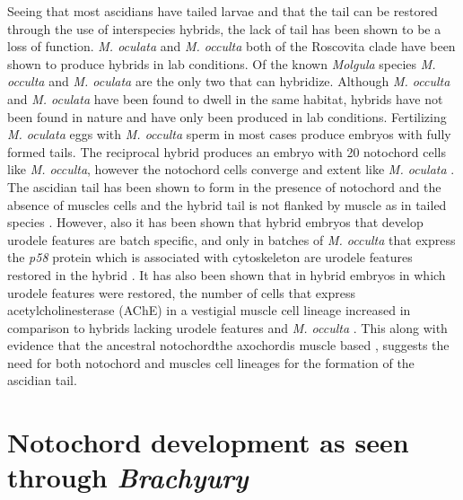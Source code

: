 Seeing that most ascidians have tailed larvae and that the tail can be restored through the use of interspecies hybrids, the lack of tail has been shown to be a loss of function. \textit{M. oculata} and \textit{M. occulta} both of the Roscovita clade have been shown to produce hybrids in lab conditions. Of the known \textit{Molgula} species \textit{M. occulta} and \textit{M. oculata} are the only two that can hybridize. Although \textit{M. occulta} and \textit{M. oculata} have been found to dwell in the same habitat, hybrids have not been found in nature and have only been produced in lab conditions. Fertilizing \textit{M. oculata} eggs with \textit{M. occulta} sperm in most cases produce embryos with fully formed tails. The reciprocal hybrid produces an embryo with 20 notochord cells like \textit{M. occulta}, however the notochord cells converge and extent like \textit{M. oculata} \cite{swalla_interspecific_1990}. The ascidian tail has been shown to form in the presence of notochord and the absence of muscles cells \cite{miyamoto_formation_1985} and the hybrid tail is not flanked by muscle as in tailed species \cite{swalla_novel_1993}. However, also it has been shown that hybrid embryos that develop urodele features are batch specific, and only in batches of \textit{M. occulta} that express the \textit{p58} protein which is associated with cytoskeleton are urodele features restored in the hybrid \cite{swalla_identification_1991,jeffery_factors_1992}. It has also been shown that in hybrid embryos in which urodele features were restored, the number of cells that express acetylcholinesterase (AChE) in a vestigial muscle cell lineage increased in comparison to hybrids lacking urodele features and \textit{M. occulta} \cite{jeffery_evolutionary_1991}. This along with evidence that the ancestral notochord\textemdash the axochord\textemdash is muscle based \cite{lauri_development_2014}, suggests the need for both notochord and muscles cell lineages for the formation of the ascidian tail. 

\section{Notochord development as seen through \textit{Brachyury}}

